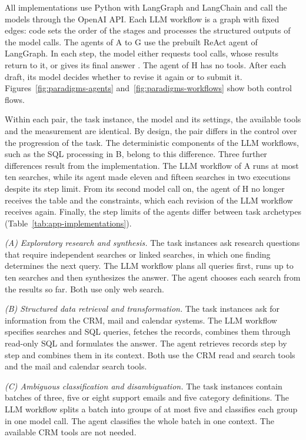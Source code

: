 All implementations use Python with LangGraph and LangChain and call the models through the OpenAI API. Each LLM workflow is a graph with fixed edges: code sets the order of the stages and processes the structured outputs of the model calls. The agents of A to G use the prebuilt ReAct agent of LangGraph. In each step, the model either requests tool calls, whose results return to it, or gives its final answer \parencite{yaoReActSynergizingReasoning2023}. The agent of H has no tools. After each draft, its model decides whether to revise it again or to submit it. Figures~\ref{fig:paradigms-agents} and~\ref{fig:paradigms-workflows} show both control flows.

Within each pair, the task instance, the model and its settings, the available tools and the measurement are identical. By design, the pair differs in the control over the progression of the task. The deterministic components of the LLM workflows, such as the SQL processing in B, belong to this difference. Three further differences result from the implementation. The LLM workflow of A runs at most ten searches, while its agent made eleven and fifteen searches in two executions despite its step limit. From its second model call on, the agent of H no longer receives the table and the constraints, which each revision of the LLM workflow receives again. Finally, the step limits of the agents differ between task archetypes (Table~\ref{tab:app-implementations}).

\emph{(A) Exploratory research and synthesis.} The task instances ask research questions that require independent searches or linked searches, in which one finding determines the next query. The LLM workflow plans all queries first, runs up to ten searches and then synthesizes the answer. The agent chooses each search from the results so far. Both use only web search.

\emph{(B) Structured data retrieval and transformation.} The task instances ask for information from the CRM, mail and calendar systems. The LLM workflow specifies searches and SQL queries, fetches the records, combines them through read-only SQL and formulates the answer. The agent retrieves records step by step and combines them in its context. Both use the CRM read and search tools and the mail and calendar search tools.

\emph{(C) Ambiguous classification and disambiguation.} The task instances contain batches of three, five or eight support emails and five category definitions. The LLM workflow splits a batch into groups of at most five and classifies each group in one model call. The agent classifies the whole batch in one context. The available CRM tools are not needed.

